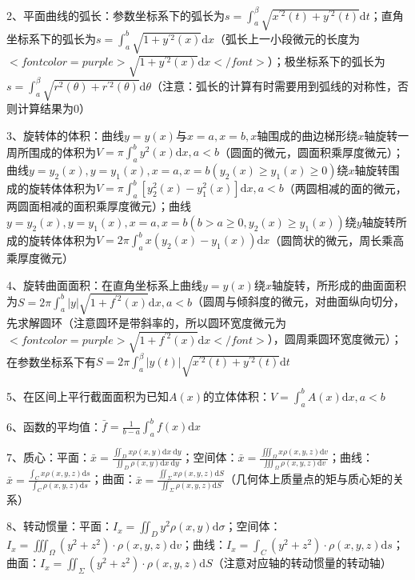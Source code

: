 2、平面曲线的弧长：参数坐标系下的弧长为$ s=\int_{a}^{\beta} \sqrt{x^{\prime 2}(t)+y^{\prime 2}(t)} \mathrm{d} t $；直角坐标系下的弧长为$ s=\int_{a}^{b} \sqrt{1+y^{\prime 2}(x)} \mathrm{d} x $（弧长上一小段微元的长度为$ <font color=purple>\sqrt{1+y^{\prime 2}(x)} \mathrm{d} x</font> $）；极坐标系下的弧长为$ s=\int_{a}^{\beta} \sqrt{r^{2}(\theta)+r^{\prime 2}(\theta)} \mathrm{d} \theta $（注意：弧长的计算有时需要用到弧线的对称性，否则计算结果为0）

3、旋转体的体积：曲线$ y=y(x) $与$ x=a, x=b, x $轴围成的曲边梯形绕$ x $轴旋转一周所围成的体积为$ V=\pi \int_{a}^{b} y^{2}(x) \mathrm{d} x, a<b $（圆面的微元，圆面积乘厚度微元）；曲线$ y=y_{2}(x), y=y_{1}(x), x=a, x=b\left(y_{2}(x) \geqslant y_{1}(x) \geqslant 0\right) $绕$ x $轴旋转围成的旋转体体积为$ V=\pi \int_{a}^{b}\left[y_{2}^{2}(x)-y_{1}^{2}(x)\right] \mathrm{d} x, a<b $（两圆相减的面的微元，两圆面相减的面积乘厚度微元）；曲线$ y=y_{2}(x), y=y_{1}(x), x=a, x=b\left(b>a \geqslant 0, y_{2}(x) \geqslant y_{1}(x)\right) $绕$ y $轴旋转所成的旋转体体积为$ V=2 \pi \int_{a}^{b} x\left(y_{2}(x)-y_{1}(x)\right) \mathrm{d} x $（圆筒状的微元，周长乘高乘厚度微元）

4、旋转曲面面积：在直角坐标系上曲线$ y=y(x) $绕$ x $轴旋转，所形成的曲面面积为$ S=2 \pi \int_{a}^{b}|y| \sqrt{1+f^{\prime 2}(x)} \mathrm{d} x, a<b $（圆周与倾斜度的微元，对曲面纵向切分，先求解圆环（注意圆环是带斜率的，所以圆环宽度微元为$ <font color=purple>\sqrt{1+f^{\prime 2}(x)} \mathrm{d} x</font> $），圆周乘圆环宽度微元）；在参数坐标系下有$ S=2 \pi \int_{a}^{\beta}|y(t)| \sqrt{x^{\prime 2}(t)+y^{\prime 2}(t)} \mathrm{d} t $

5、在区间上平行截面面积为已知$ A(x) $的立体体积：$ V=\int_{a}^{b} A(x) \mathrm{d} x, a<b $

6、函数的平均值：$ \bar{f}=\frac{1}{b-a} \int_{a}^{b} f(x) \mathrm{d} x $

7、质心：平面：$ \bar{x}=\frac{\iint_{D} x \rho(x, y) \mathrm{d} x \mathrm{~d} y}{\iint_{D} \rho(x, y) \mathrm{d} x \mathrm{~d} y} $；空间体：$ \bar{x}=\frac{\iiint_{\Omega} x \rho(x, y, z) \mathrm{d} v}{\iiint_{\Omega} \rho(x, y, z) \mathrm{d} v} $；曲线：$ \bar{x}=\frac{\int_{C} x \rho(x, y, z) \mathrm{d} s}{\int_{C} \rho(x, y, z) \mathrm{d} s} $；曲面：$ \bar{x}=\frac{\iint_{\Sigma} x \rho(x, y, z) \mathrm{d} S}{\iint_{\Sigma} \rho(x, y, z) \mathrm{d} S} $（几何体上质量点的矩与质心矩的关系）

8、转动惯量：平面：$ I_{x}=\iint_{D} y^{2} \rho(x, y) \mathrm{d} \sigma $；空间体：$ I_{x}=\iiint_{\Omega}\left(y^{2}+z^{2}\right) \cdot \rho(x, y, z) \mathrm{d} v $；曲线：$ I_{x}=\int_{C}\left(y^{2}+z^{2}\right) \cdot \rho(x, y, z) \mathrm{d} s $；曲面：$ I_{x}=\iint_{\Sigma}\left(y^{2}+z^{2}\right) \cdot \rho(x, y, z) \mathrm{d} S $（注意对应轴的转动惯量的转动轴）


